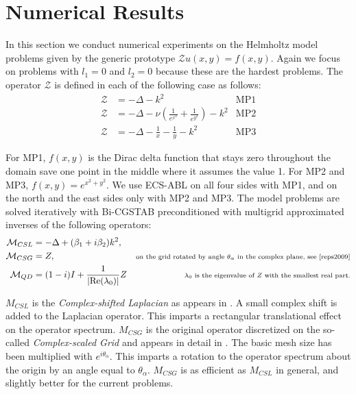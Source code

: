 \documentclass[mathpazo]{cicp}
\theoremstyle{definition}
\numberwithin{equation}{section}
\providecommand{\wv}{}
\providecommand{\hbz}{}
\begin{document}
\section{Numerical Results}
\label{sec:numex}
 In this section we conduct numerical experiments on the Helmholtz
 model problems given by the generic prototype
 $\mathcal{Z}u(x,y)=f(x,y)$. \wv{Again we focus on problems with $l_1=0$
 and $l_2=0$ because these are the hardest problems.} The operator
 $\mathcal{Z}$ is defined in each of the following case as follows:
\begin{align}
 \mathcal{Z} &= -\Delta - k^2 & \text{MP1} \\
 \mathcal{Z} &= -\Delta - \nu(\frac{1}{e^{x^2}}+\frac{1}{e^{y^2}}) - k^2 & \text{MP2}\\
 \mathcal{Z} &= -\Delta -\frac{1}{x} - \frac{1}{y} - k^2 & \text{MP3}
\end{align}


For MP1, $f(x,y)$ is the Dirac delta function that stays zero throughout the domain save one point in the middle where it assumes the value 1. For MP2 and MP3, $f(x,y) = e^{x^2+y^2}$. We use ECS-ABL on all four sides with MP1, and on the north and the east sides only with MP2 and MP3. \hbz{The model problems are solved iteratively with Bi-CGSTAB preconditioned with multigrid approximated inverses of the following operators}:
\begin{align}
 \mathcal{M}_{CSL} &= -\Delta + (\beta_1 + i\beta_2)k^2,\\
 \mathcal{M}_{CSG} &= Z, & {\scriptstyle \text{on the grid rotated by angle $\theta_{\alpha}$ in the complex plane, see \cite{reps2009}}}\\
 \mathcal{M}_{QD} &= (1-i)I + \frac{1}{\lvert \text{Re}(\lambda_0) \rvert}Z & {\scriptstyle \text{$\lambda_0$ is the eigenvalue of $Z$ with the smallest real part.}}
\end{align}

\hbz{$M_{CSL}$ is the \textit{Complex-shifted Laplacian} as appears in \cite{Yogi06}. A small complex shift is added to the Laplacian operator. This imparts a rectangular translational effect on the operator spectrum. $M_{CSG}$ is the original operator discretized on the so-called \textit{Complex-scaled Grid} and appears in detail in \cite{reps2009}. The basic mesh size has been multiplied with $e^{i\theta_{\alpha}}$. This imparts a rotation to the operator spectrum about the origin by an angle equal to $\theta_{\alpha}$. $M_{CSG}$ is as efficient as $M_{CSL}$ in general, and slightly better for the current problems. }
\end{document}
